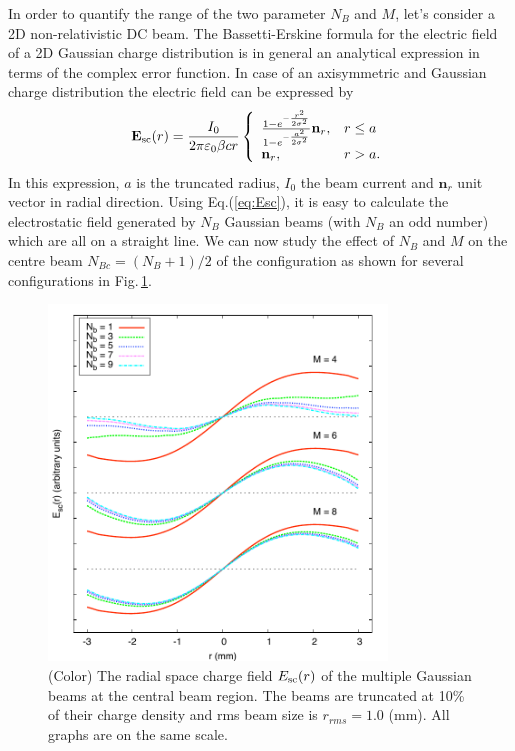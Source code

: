 \documentclass[aps,prstab,onecolumn,superscriptaddress,showpacs]{revtex4}
\newcommand{\bs}[1]{\mathbf #1}
\begin{document}
In order to quantify the range of the two parameter $N_B$ and $M$, let's consider a 2D non-relativistic DC beam. 
The Bassetti-Erskine \cite{bassersk} formula for the electric field of a 2D Gaussian charge distribution is in general an analytical expression 
in terms of the complex error function.  In case of an axisymmetric and Gaussian charge distribution the electric field can be expressed by 
\begin{equation}\label{eq:Esc}
  \bs{E_{\RM{sc}}(r)} = \frac{I_0}{2\pi\varepsilon_0\beta cr} \left\{
    \begin{array}{ll}
      \frac{1-e^{-\frac{r^2}{2\sigma^2}}}{1-e^{-\frac{a^2}{2\sigma^2}}}\bs{n}_r, & r \le a \\
      \bs{n}_r, & r > a .
    \end{array}
    \right.
\end{equation}  
In this expression, $a$ is the truncated radius, $I_0$ the beam current and $\bs{n}_r$ unit vector in radial direction.
Using Eq.(\ref{eq:Esc}), it is easy to calculate the electrostatic field generated by $N_B$ Gaussian beams (with $N_B$ an odd number) which are all on a straight line.
We can now study the effect of $N_B$ and $M$ on the centre beam $N_{Bc} = (N_B+1)/2$ of the configuration as shown for several configurations in Fig.\,\ref{fig:EscMB}.
\begin{figure}
    \includegraphics[width=9cm]{figures/ydist.pdf}
    \caption{(Color)  The radial space charge field $E_{\RM{sc}}{(r)}$ of the multiple Gaussian beams at the central beam region.
      The beams are truncated at 10\% of their charge density and rms beam size is $r_{rms} = 1.0$ (mm). All graphs are on the same scale.}
    \label{fig:EscMB}
\end{figure}
\end{document}
